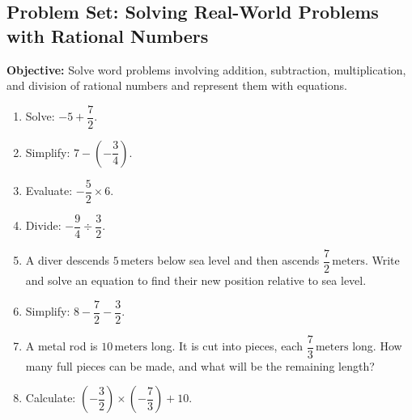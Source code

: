 \documentclass[12pt]{article}
\title{}
\date{}
\begin{document}
\subsection*{Problem Set: Solving Real-World Problems with Rational Numbers}
\onehalfspacing

\begin{tcolorbox}[colframe=black!40, colback=gray!5, 
coltitle=black, colbacktitle=black!20, fonttitle=\bfseries\Large, 
title=Learning Objective, halign title=center, left=5pt, right=5pt, top=5pt, bottom=15pt]
\textbf{Objective:} Solve word problems involving addition, subtraction, multiplication, and division of rational numbers and represent them with equations.
\end{tcolorbox}

\begin{tcolorbox}[colframe=black!60, colback=white, 
coltitle=black, colbacktitle=black!15, fonttitle=\bfseries\Large, 
title=Exercises, halign title=center, left=10pt, right=10pt, top=10pt, bottom=70pt]
\begin{enumerate}[itemsep=2.5em]
    \item Solve: \( -5 + \dfrac{7}{2} \).
    \item Simplify: \( 7 - \left( -\dfrac{3}{4} \right) \).
    \item Evaluate: \( -\dfrac{5}{2} \times 6 \).
    \item Divide: \( -\dfrac{9}{4} \div \dfrac{3}{2} \).
    \item A diver descends \( 5 \, \text{meters} \) below sea level and then ascends \( \dfrac{7}{2} \, \text{meters} \). Write and solve an equation to find their new position relative to sea level.
    \item Simplify: \( 8 - \dfrac{7}{2} - \dfrac{3}{2} \).
    \item A metal rod is \( 10 \, \text{meters} \) long. It is cut into pieces, each \( \dfrac{7}{3} \, \text{meters} \) long. How many full pieces can be made, and what will be the remaining length?
    \item Calculate: \( (-\dfrac{3}{2}) \times (-\dfrac{7}{3}) + 10 \).
\end{enumerate}
\end{tcolorbox}


\vspace{1em}
\end{document}

